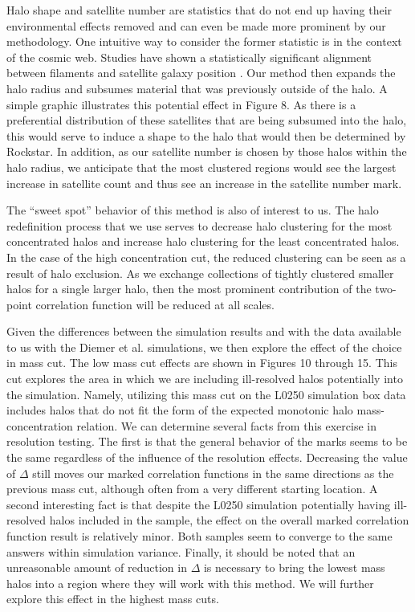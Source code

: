 \documentclass[usenatbib,usegraphicx,letterpaper]{mn2e}
\begin{document}
Halo shape and satellite number are statistics that do not end up having their environmental effects removed and can even be made more prominent by our methodology. One intuitive way to consider the former statistic is in the context of the cosmic web. Studies have shown a statistically significant alignment between filaments and satellite galaxy position \citep{tempel15, velliscig15}. Our method then expands the halo radius and subsumes material that was previously outside of the halo. A simple graphic illustrates this potential effect in Figure 8. As there is a preferential distribution of these satellites that are being subsumed into the halo, this would serve to induce a shape to the halo that would then be determined by Rockstar. In addition, as our satellite number is chosen by those halos within the halo radius, we anticipate that the most clustered regions would see the largest increase in satellite count and thus see an increase in the satellite number mark.

The ``sweet spot'' behavior of this method is also of interest to us. The halo redefinition process that we use serves to decrease halo clustering for the most concentrated halos and increase halo clustering for the least concentrated halos. In the case of the high concentration cut, the reduced clustering can be seen as a result of halo exclusion. As we exchange collections of tightly clustered smaller halos for a single larger halo, then the most prominent contribution of the two-point correlation function will be reduced at all scales.

Given the differences between the simulation results and with the data available to us with the Diemer et al. simulations, we then explore the effect of the choice in mass cut. The low mass cut effects are shown in Figures 10 through 15. This cut explores the area in which we are including ill-resolved halos potentially into the simulation. Namely, utilizing this mass cut on the L0250 simulation box data includes halos that do not fit the form of the expected monotonic halo mass-concentration relation. We can determine several facts from this exercise in resolution testing. The first is that the general behavior of the marks seems to be the same regardless of the influence of the resolution effects. Decreasing the value of $\Delta$ still moves our marked correlation functions in the same directions as the previous mass cut, although often from a very different starting location. A second interesting fact is that despite the L0250 simulation potentially having ill-resolved halos included in the sample, the effect on the overall marked correlation function result is relatively minor. Both samples seem to converge to the same answers within simulation variance. Finally, it should be noted that an unreasonable amount of reduction in $\Delta$ is necessary to bring the lowest mass halos into a region where they will work with this method. We will further explore this effect in the highest mass cuts.
\end{document}
